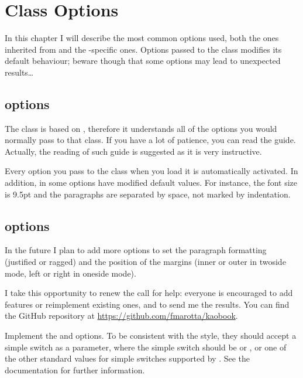 \setchapterpreamble[u]{\margintoc}
\chapter{Class Options}

In this chapter I will describe the most common options used, both the 
ones inherited from  and the -specific ones. 
Options passed to the class modifies its default behaviour; beware 
though that some options may lead to unexpected results\ldots

\section{ options}

The  class is based on , therefore it 
understands all of the options you would normally pass to that class. If 
you have a lot of patience, you can read the \KOMAScript\xspace 
guide. Actually, the reading 
of such guide is suggested as it is very instructive.

Every \KOMAScript\xspace option you pass to the class when you load it 
is automatically activated. In addition, in  some options 
have modified default values. For instance, the font size is 9.5pt and 
the paragraphs are separated by space, not marked by indentation.

\section{ options}

In the future I plan to add more options to set the paragraph formatting 
(justified or ragged) and the position of the margins (inner or outer in 
twoside mode, left or right in oneside mode).

I take this opportunity to renew the call for help: everyone is 
encouraged to add features or reimplement existing ones, and to send me 
the results. You can find the GitHub repository at 
\url{https://github.com/fmarotta/kaobook}.

\begin{kaobox}[frametitle=To Do]
Implement the  and  options. To be 
consistent with the \KOMAScript\xspace style, they should accept a 
simple switch as a parameter, where the simple switch should be 
 or , or one of the other standard values for 
simple switches supported by \KOMAScript. See the \KOMAScript\xspace 
documentation for further information.
\end{kaobox}

